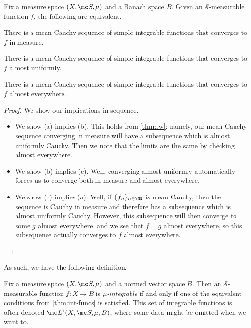 \documentclass[../notes.tex]{subfiles}
\begin{document}
\begin{theorem} \label{thm:int-funcs}
	Fix a measure space $(X,\mc S,\mu)$ and a Banach space $B$. Given an $\mathcal S$-measurable function $f$, the following are equivalent.
	\begin{listalph}
		\item There is a mean Cauchy sequence of simple integrable functions that converges to $f$ in measure.
		\item There is a mean Cauchy sequence of simple integrable functions that converges to $f$ almost uniformly.
		\item There is a mean Cauchy sequence of simple integrable functions that converges to $f$ almost everywhere.
	\end{listalph}
\end{theorem}
\begin{proof}
	We show our implications in sequence.
	\begin{itemize}
		\item We show (a) implies (b). This holds from \autoref{thm:rw}: namely, our mean Cauchy sequence converging in measure will have a subsequence which is almost uniformly Cauchy. Then we note that the limits are the same by checking almost everywhere.
		\item We show (b) implies (c). Well, converging almost uniformly automatically forces us to converge both in measure and almost everywhere.
		\item We show (c) implies (a). Well, if $\{f_n\}_{n\in\NN}$ is mean Cauchy, then the sequence is Cauchy in measure and therefore has a subsequence which is almost uniformly Cauchy. However, this subsequence will then converge to some $g$ almost everywhere, and we see that $f=g$ almost everywhere, so this subsequence actually converges to $f$ almost everywhere.
		\qedhere
	\end{itemize}
\end{proof}
As such, we have the following definition.
\begin{definition}[Integrable]
	Fix a measure space $(X,\mc S,\mu)$ and a normed vector space $B$. Then an $\mathcal S$-measurable function $f\colon X\to B$ is \textit{$\mu$-integrable} if and only if one of the equivalent conditions from \autoref{thm:int-funcs} is satisfied. This set of integrable functions is often denoted $\mc L^1(X,\mc S,\mu,B)$, where some data might be omitted when we want to.
\end{definition}
\end{document}

